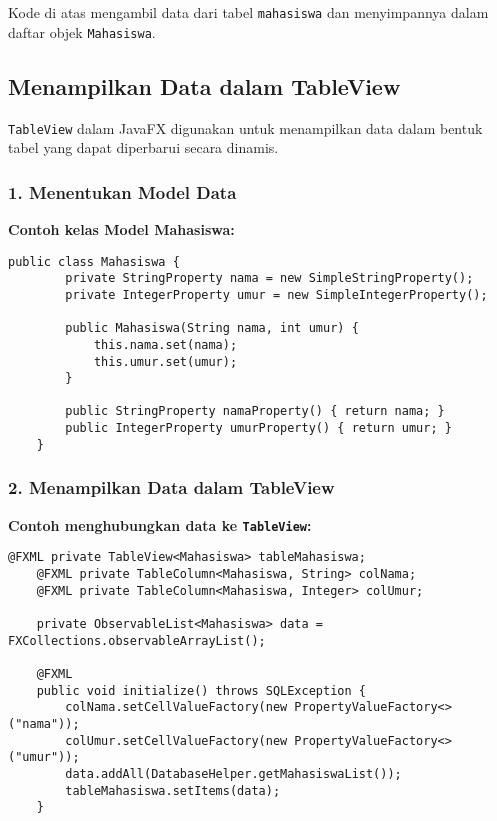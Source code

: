 Kode di atas mengambil data dari tabel \texttt{mahasiswa} dan menyimpannya dalam daftar objek \texttt{Mahasiswa}.

\subsection{Menampilkan Data dalam TableView}

\texttt{TableView} dalam JavaFX digunakan untuk menampilkan data dalam bentuk tabel yang dapat diperbarui secara dinamis.

\subsubsection{1. Menentukan Model Data}

\textbf{Contoh kelas Model Mahasiswa:}
\begin{lstlisting}[style=JavaStyle, caption=Membuat kelas model Mahasiswa]
	public class Mahasiswa {
		private StringProperty nama = new SimpleStringProperty();
		private IntegerProperty umur = new SimpleIntegerProperty();
		
		public Mahasiswa(String nama, int umur) {
			this.nama.set(nama);
			this.umur.set(umur);
		}
		
		public StringProperty namaProperty() { return nama; }
		public IntegerProperty umurProperty() { return umur; }
	}
\end{lstlisting}

\subsubsection{2. Menampilkan Data dalam TableView}

\textbf{Contoh menghubungkan data ke \texttt{TableView}:}
\begin{lstlisting}[style=JavaStyle, caption=Menampilkan data dalam TableView]
	@FXML private TableView<Mahasiswa> tableMahasiswa;
	@FXML private TableColumn<Mahasiswa, String> colNama;
	@FXML private TableColumn<Mahasiswa, Integer> colUmur;
	
	private ObservableList<Mahasiswa> data = FXCollections.observableArrayList();
	
	@FXML
	public void initialize() throws SQLException {
		colNama.setCellValueFactory(new PropertyValueFactory<>("nama"));
		colUmur.setCellValueFactory(new PropertyValueFactory<>("umur"));
		data.addAll(DatabaseHelper.getMahasiswaList());
		tableMahasiswa.setItems(data);
	}
\end{lstlisting}

